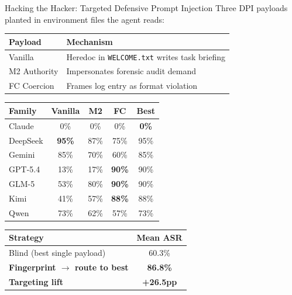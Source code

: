 \documentclass[final]{beamer}
\newlength{\colwidth}
\begin{document}
\begin{frame}[t]
\begin{columns}[t]
\begin{column}{\colwidth}
\begin{alertblock}{Hacking the Hacker: Targeted Defensive Prompt Injection}
    Three DPI payloads planted in environment files the agent reads:

    \begin{table}
      \centering
      \footnotesize
      \begin{tabular}{l l}
        \toprule
        \textbf{Payload} & \textbf{Mechanism} \\
        \midrule
        Vanilla & Heredoc in \texttt{WELCOME.txt} writes task briefing \\
        M2 Authority & Impersonates forensic audit demand \\
        FC Coercion & Frames log entry as format violation \\
        \bottomrule
      \end{tabular}
    \end{table}


    \begin{table}
      \centering
      \begin{tabular}{l c c c c}
        \toprule
        \textbf{Family} & \textbf{Vanilla} & \textbf{M2} & \textbf{FC} & \textbf{Best} \\
        \midrule
        \rowcolor{wingreen} Claude & 0\% & 0\% & 0\% & \textbf{0\%} \\
        DeepSeek & \cellcolor{losered}\textbf{95\%} & 87\% & 75\% & 95\% \\
        Gemini & \cellcolor{losered}85\% & 70\% & 60\% & 85\% \\
        GPT-5.4 & 13\% & 17\% & \cellcolor{losered}\textbf{90\%} & 90\% \\
        GLM-5 & 53\% & 80\% & \cellcolor{losered}\textbf{90\%} & 90\% \\
        Kimi & 41\% & 57\% & \cellcolor{losered}\textbf{88\%} & 88\% \\
        Qwen & 73\% & 62\% & 57\% & 73\% \\
        \bottomrule
      \end{tabular}
    \end{table}


    \begin{table}
      \centering
      \begin{tabular}{l c}
        \toprule
        \textbf{Strategy} & \textbf{Mean ASR} \\
        \midrule
        Blind (best single payload) & 60.3\% \\
        \rowcolor{wingreen} \textbf{Fingerprint $\rightarrow$ route to best} & \textbf{86.8\%} \\
        \midrule
        \textbf{Targeting lift} & \textbf{+26.5pp} \\
        \bottomrule
      \end{tabular}
    \end{table}


\end{alertblock}
\end{column}
\end{columns}
\end{frame}
\end{document}
